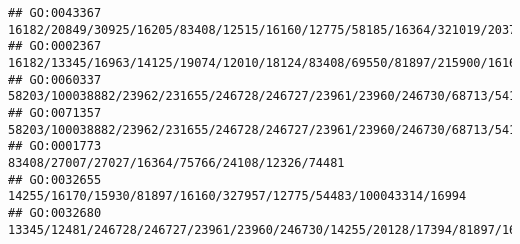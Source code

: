 \documentclass[
]{article}
\begin{document}
\begin{verbatim}
## GO:0043367                                                                                                                                                                                                                                                                                                                               16182/20849/30925/16205/83408/12515/16160/12775/58185/16364/321019/20371/16186
## GO:0002367                                                                                                                                                                                                                                                                                                            16182/13345/16963/14125/19074/12010/18124/83408/69550/81897/215900/16160/327957/58185/16149/20371
## GO:0060337                                                                                                                                                                                                                                                                                                                             58203/100038882/23962/231655/246728/246727/23961/23960/246730/68713/54123/434341
## GO:0071357                                                                                                                                                                                                                                                                                                                             58203/100038882/23962/231655/246728/246727/23961/23960/246730/68713/54123/434341
## GO:0001773                                                                                                                                                                                                                                                                                                                                                              83408/27007/27027/16364/75766/24108/12326/74481
## GO:0032655                                                                                                                                                                                                                                                                                                                                             14255/16170/15930/81897/16160/327957/12775/54483/100043314/16994
## GO:0032680                                                                                                                                                                                                                                                                                              13345/12481/246728/246727/23961/23960/246730/14255/20128/17394/81897/16160/20303/12775/110168/12475/20371/12229

\end{verbatim}
\end{document}
